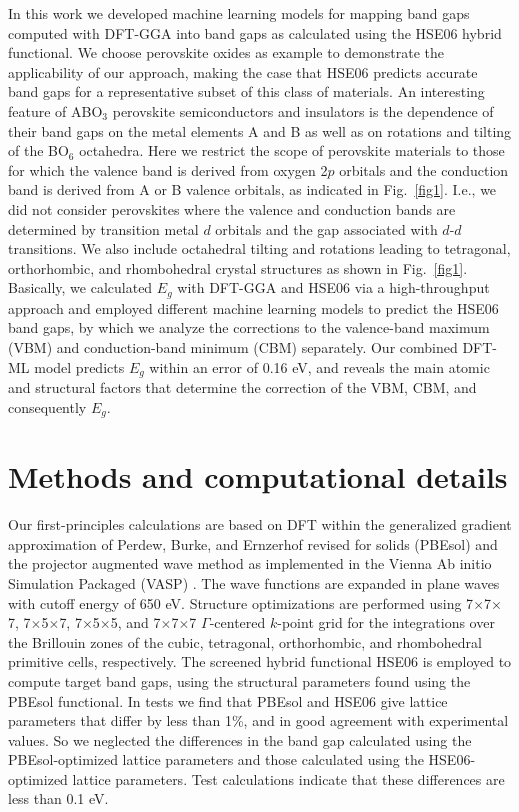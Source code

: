 \documentclass[%
reprint,
superscriptaddress,
citeautoscript,
 amsmath,amssymb,
 aps,
 prl,
floatfix,
]{revtex4-1}
\begin{document}
In this work we developed machine learning models for mapping band gaps computed with DFT-GGA into band gaps as calculated using the HSE06 hybrid functional. We choose perovskite oxides as example to demonstrate the applicability of our approach, making the case that HSE06 predicts accurate band gaps for a representative subset of this class of materials. An interesting feature of ABO$_{3}$ perovskite semiconductors and insulators is the dependence of their band  gaps on the metal elements A and B as well as on rotations and tilting of the BO$_6$ octahedra. Here we restrict the scope of perovskite materials to those for which the valence band is derived from oxygen 2$p$ orbitals and the conduction band is derived from A or B valence orbitals, as indicated in Fig.~\ref{fig1}. I.e., we did not consider perovskites where the valence and conduction bands are determined by transition metal $d$ orbitals and the gap associated with $d$-$d$ transitions. We also include octahedral tilting and rotations leading to tetragonal, orthorhombic, and rhombohedral crystal structures as shown in Fig.~\ref{fig1}. Basically, we calculated $E_{g}$ with DFT-GGA and HSE06 via a high-throughput approach and employed different machine learning models to predict the HSE06 band gaps, by which we analyze the corrections to the valence-band maximum (VBM) and conduction-band minimum (CBM) separately. Our combined DFT-ML model predicts $E_{g}$ within an error of 0.16 eV, and reveals the main atomic and structural factors that determine the correction of the VBM, CBM, and consequently $E_{g}$. 

\section{Methods and computational details}

Our first-principles calculations are based on DFT within the generalized gradient approximation of Perdew, Burke, and Ernzerhof revised for solids (PBEsol)  \cite{Perdew} and the projector augmented wave  method \cite{Blochl1994,Kresse1999} as implemented in the Vienna Ab initio Simulation Packaged (\textsc{VASP}) \cite{Kresse1993a,Kresse1993b}.
The wave functions are expanded in plane waves with cutoff energy of 650 eV. Structure optimizations are performed using 7$\times$7$\times$7, 7$\times$5$\times$7, 7$\times$5$\times$5, and 7$\times$7$\times$7 $\Gamma$-centered $k$-point grid for the integrations over the Brillouin zones of the cubic, tetragonal, orthorhombic, and rhombohedral primitive cells, respectively. The screened hybrid functional  HSE06  \cite{Heyd2003,Heyd2006} is employed to compute target band gaps, using the structural parameters found using the PBEsol functional. In tests we find that PBEsol and HSE06 give lattice parameters that differ by less than 1\%, and in good agreement with experimental values. So we neglected the differences in the band gap calculated using the PBEsol-optimized lattice parameters and those calculated using the HSE06-optimized lattice parameters. Test calculations indicate that these differences are less than 0.1 eV.
 
\end{document}
